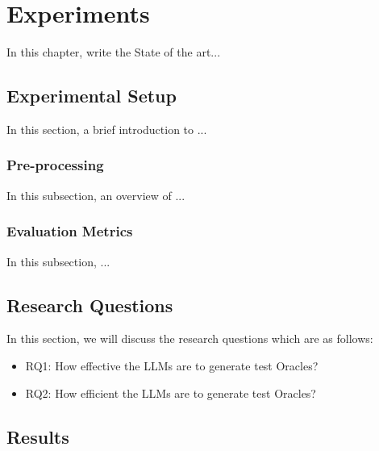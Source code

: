 \chapter{Experiments}
\label{cha:experiments}
\vspace{0.4 cm}

In this chapter, write the State of the art...

\section{Experimental Setup}
\label{sec:experimental_setup}
\vspace{0.2 cm}

In this section, a brief introduction to ... 

\vspace{0.1 cm}
\subsection{Pre-processing}
\label{sec:preprocessing}
\vspace{0.1 cm}

In this subsection, an overview of ...

\vspace{0.1 cm}
\subsection{Evaluation Metrics}
\label{sec:evaluation_metrics}
\vspace{0.1 cm}

In this subsection, ...

\section{Research Questions}
\label{sec:research_questions}
\vspace{0.2 cm}

In this section, we will discuss the research questions which are as follows:
\begin{itemize}
  \item RQ1: How effective the LLMs are to generate test Oracles?
  \item RQ2: How efficient the LLMs are to generate test Oracles?
\end{itemize}

\section{Results}
\label{sec:results}
\vspace{0.2 cm}

